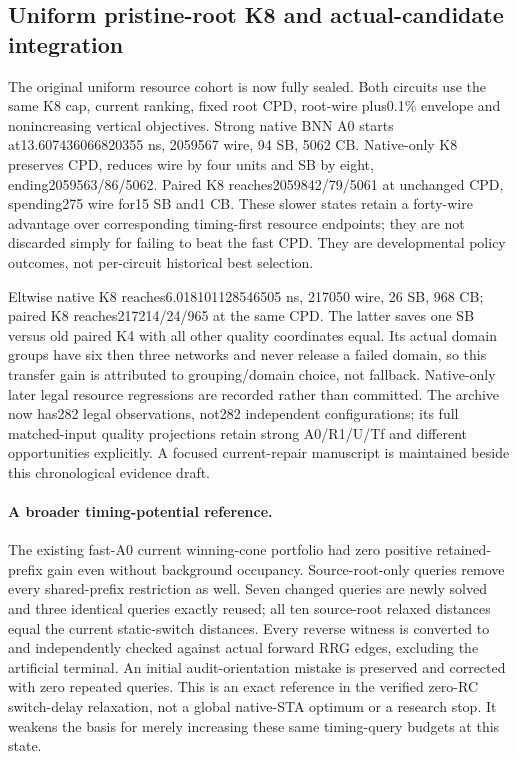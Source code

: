 \subsection{Uniform pristine-root K8 and actual-candidate integration}
The original uniform resource cohort is now fully sealed. Both circuits use the same K8 cap, current ranking, fixed root CPD, root-wire plus0.1\% envelope and nonincreasing vertical objectives. Strong native BNN A0 starts at13.607436066820355 ns, 2059567 wire, 94 SB, 5062 CB. Native-only K8 preserves CPD, reduces wire by four units and SB by eight, ending2059563/86/5062. Paired K8 reaches2059842/79/5061 at unchanged CPD, spending275 wire for15 SB and1 CB. These slower states retain a forty-wire advantage over corresponding timing-first resource endpoints; they are not discarded simply for failing to beat the fast CPD. They are developmental policy outcomes, not per-circuit historical best selection.

Eltwise native K8 reaches6.018101128546505 ns, 217050 wire, 26 SB, 968 CB; paired K8 reaches217214/24/965 at the same CPD. The latter saves one SB versus old paired K4 with all other quality coordinates equal. Its actual domain groups have six then three networks and never release a failed domain, so this transfer gain is attributed to grouping/domain choice, not fallback. Native-only later legal resource regressions are recorded rather than committed. The archive now has282 legal observations, not282 independent configurations; its full matched-input quality projections retain strong A0/R1/U/Tf and different opportunities explicitly. A focused current-repair manuscript is maintained beside this chronological evidence draft.

\paragraph{A broader timing-potential reference.}
The existing fast-A0 current winning-cone portfolio had zero positive retained-prefix gain even without background occupancy. Source-root-only queries remove every shared-prefix restriction as well. Seven changed queries are newly solved and three identical queries exactly reused; all ten source-root relaxed distances equal the current static-switch distances. Every reverse witness is converted to and independently checked against actual forward RRG edges, excluding the artificial terminal. An initial audit-orientation mistake is preserved and corrected with zero repeated queries. This is an exact reference in the verified zero-RC switch-delay relaxation, not a global native-STA optimum or a research stop. It weakens the basis for merely increasing these same timing-query budgets at this state.

